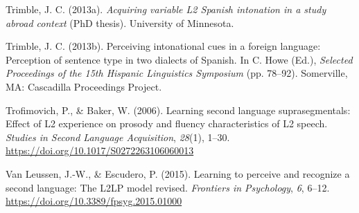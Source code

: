 \documentclass[]{article}
\newlength{\cslhangindent}
\newenvironment{CSLReferences}[2] %
 {%
  \setlength{\parindent}{0pt}
  \ifodd #1 \everypar{\setlength{\hangindent}{\cslhangindent}}\ignorespaces\fi
  \ifnum #2 > 0
  \setlength{\parskip}{#2\baselineskip}
  \fi
 }%
 {}
\begin{document}
\begin{CSLReferences}{1}{0}
\leavevmode{}%
Trimble, J. C. (2013a). \emph{Acquiring variable {L}2 {S}panish intonation in a study abroad context} (PhD thesis). University of Minnesota.

\leavevmode{}%
Trimble, J. C. (2013b). Perceiving intonational cues in a foreign language: {P}erception of sentence type in two dialects of {S}panish. In C. Howe (Ed.), \emph{{Selected Proceedings of the 15th Hispanic Linguistics Symposium}} (pp. 78--92). Somerville, MA: Cascadilla Proceedings Project.

\leavevmode{}%
Trofimovich, P., \& Baker, W. (2006). Learning second language suprasegmentals: Effect of {L}2 experience on prosody and fluency characteristics of {L}2 speech. \emph{Studies in Second Language Acquisition}, \emph{28}(1), 1--30. \url{https://doi.org/10.1017/S0272263106060013}

\leavevmode{}%
Van Leussen, J.-W., \& Escudero, P. (2015). Learning to perceive and recognize a second language: {T}he {L2LP} model revised. \emph{Frontiers in Psychology}, \emph{6}, 6--12. \url{https://doi.org/10.3389/fpsyg.2015.01000}

\end{CSLReferences}
\end{document}
